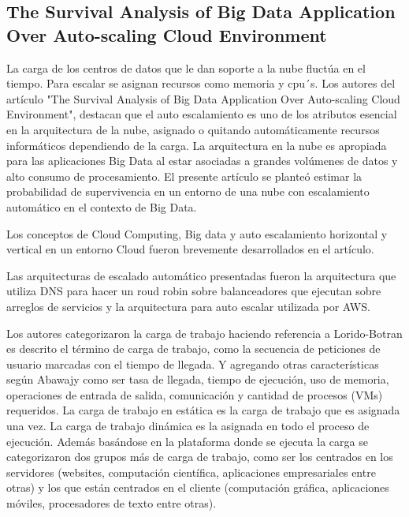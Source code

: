 \subsection{The Survival Analysis of Big Data Application
            Over Auto-scaling Cloud Environment
}

La carga de los centros de datos que le dan soporte a la nube fluctúa en el tiempo.
Para escalar se asignan recursos como memoria y cpu´s.
Los autores del artículo "The Survival Analysis of Big Data Application
Over Auto-scaling Cloud Environment"\cite[pág. 155]{somaniEmerging2019}, destacan que el auto escalamiento es uno de los atributos esencial en la arquitectura de la nube, asignado o quitando automáticamente recursos informáticos dependiendo de la carga.
La arquitectura en la nube es apropiada para las aplicaciones Big Data al estar asociadas a grandes volúmenes de datos y alto consumo de procesamiento.
El presente artículo se planteó estimar la probabilidad de supervivencia
en un entorno de una nube con escalamiento automático en el contexto de Big Data.
\par

Los conceptos de Cloud Computing, Big data y auto escalamiento horizontal y vertical en un entorno Cloud fueron brevemente desarrollados en el artículo.
\par

Las arquitecturas de escalado automático presentadas fueron la arquitectura que utiliza DNS para hacer un roud robin sobre balanceadores que ejecutan sobre arreglos de servicios y la arquitectura para auto escalar utilizada por AWS.
\par


Los autores categorizaron la carga de trabajo
haciendo referencia a Lorido-Botran es descrito el término de carga de trabajo,
como la secuencia de peticiones de usuario marcadas con el tiempo de llegada. Y agregando otras características según Abawajy como ser tasa de llegada, tiempo de ejecución, uso de memoria, operaciones de entrada de salida, comunicación y cantidad de procesos (VMs) requeridos. La carga de trabajo en estática
es la carga de trabajo que es asignada una vez. La carga de trabajo dinámica es la asignada en todo el proceso de ejecución.
Además basándose en la plataforma donde se ejecuta la carga se categorizaron dos grupos más de carga de trabajo, como ser los centrados en los servidores (websites, computación científica, aplicaciones empresariales entre otras) y los que están centrados en el cliente (computación gráfica, aplicaciones móviles, procesadores de texto entre otras).
\par


